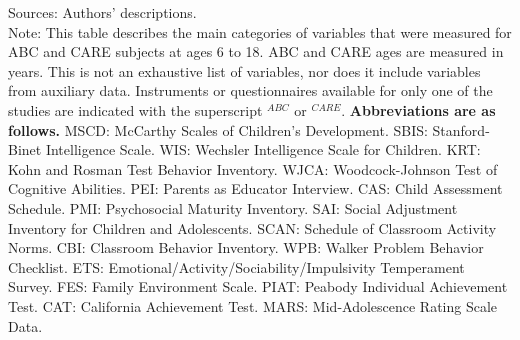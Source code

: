 \documentclass[static]{JJH-Beamer}
\begin{document}
{\flushleft \normalsize Sources: Authors' descriptions. \\
Note: This table describes the main categories of variables that were measured for ABC and CARE subjects at ages 6 to 18. ABC and CARE ages are measured in years. This is not an exhaustive list of variables, nor does it include variables from auxiliary data.  Instruments or questionnaires available for only one of the studies are indicated with the superscript $^{ABC}$ or $^{CARE}$. \textbf{Abbreviations are as follows.}  MSCD: McCarthy Scales of Children's Development. SBIS: Stanford-Binet Intelligence Scale. WIS: Wechsler Intelligence Scale for Children. KRT: Kohn and Rosman Test Behavior Inventory. WJCA: Woodcock-Johnson Test of Cognitive Abilities. PEI: Parents as Educator Interview. CAS: Child Assessment Schedule. PMI: Psychosocial Maturity Inventory. SAI: Social Adjustment Inventory for Children and Adolescents. SCAN: Schedule of Classroom Activity Norms. CBI: Classroom Behavior Inventory. WPB: Walker Problem Behavior Checklist. ETS: Emotional/Activity/Sociability/Impulsivity Temperament Survey. FES: Family Environment Scale. PIAT: Peabody Individual Achievement Test. CAT: California Achievement Test. MARS: Mid-Adolescence Rating Scale Data.\\}
\clearpage
\end{document}
